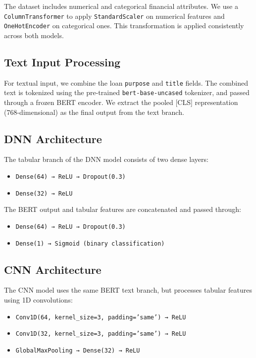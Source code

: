 The dataset includes numerical and categorical financial attributes. We use a \texttt{ColumnTransformer} to apply \texttt{StandardScaler} on numerical features and \texttt{OneHotEncoder} on categorical ones. This transformation is applied consistently across both models.

\subsection{Text Input Processing}

For textual input, we combine the loan \texttt{purpose} and \texttt{title} fields. The combined text is tokenized using the pre-trained \texttt{bert-base-uncased} tokenizer, and passed through a frozen BERT encoder. We extract the pooled [CLS] representation (768-dimensional) as the final output from the text branch.

\subsection{DNN Architecture}

The tabular branch of the DNN model consists of two dense layers:
\begin{itemize}
    \item \texttt{Dense(64) → ReLU → Dropout(0.3)}
    \item \texttt{Dense(32) → ReLU}
\end{itemize}

The BERT output and tabular features are concatenated and passed through:
\begin{itemize}
    \item \texttt{Dense(64) → ReLU → Dropout(0.3)}
    \item \texttt{Dense(1) → Sigmoid (binary classification)}
\end{itemize}

\subsection{CNN Architecture}

The CNN model uses the same BERT text branch, but processes tabular features using 1D convolutions:
\begin{itemize}
    \item \texttt{Conv1D(64, kernel\_size=3, padding='same') → ReLU}
    \item \texttt{Conv1D(32, kernel\_size=3, padding='same') → ReLU}
    \item \texttt{GlobalMaxPooling → Dense(32) → ReLU}
\end{itemize}

